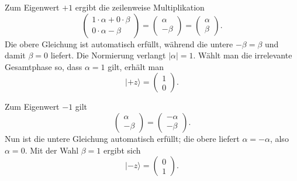 Zum Eigenwert \(+1\) ergibt die zeilenweise Multiplikation
\begin{equation}
\begin{pmatrix}
1\cdot\alpha+0\cdot\beta\\
0\cdot\alpha-\beta
\end{pmatrix}
=
\begin{pmatrix}
\alpha\\
-\beta
\end{pmatrix}
=
\begin{pmatrix}
\alpha\\
\beta
\end{pmatrix}.
\end{equation}
Die obere Gleichung ist automatisch erfüllt, während die untere \(-\beta=\beta\) und damit \(\beta=0\) liefert. Die Normierung verlangt \(|\alpha|=1\). Wählt man die irrelevante Gesamtphase so, dass \(\alpha=1\) gilt, erhält man
\begin{equation}
|+z\rangle=
\begin{pmatrix}
1\\
0
\end{pmatrix}.
\end{equation}

Zum Eigenwert \(-1\) gilt
\begin{equation}
\begin{pmatrix}
\alpha\\
-\beta
\end{pmatrix}
=
\begin{pmatrix}
-\alpha\\
-\beta
\end{pmatrix}.
\end{equation}
Nun ist die untere Gleichung automatisch erfüllt; die obere liefert \(\alpha=-\alpha\), also \(\alpha=0\). Mit der Wahl \(\beta=1\) ergibt sich
\begin{equation}
|-z\rangle=
\begin{pmatrix}
0\\
1
\end{pmatrix}.
\end{equation}


